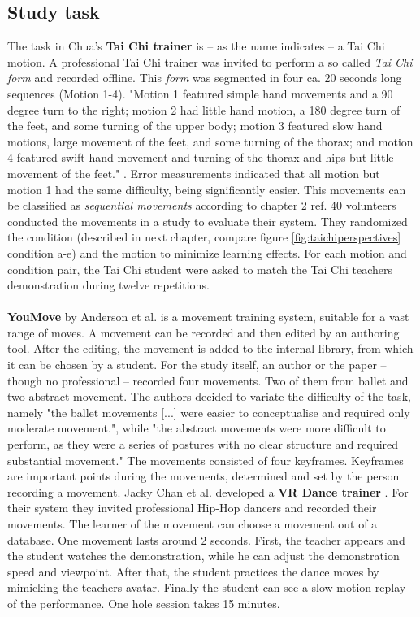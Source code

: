 \subsection{Study task}
The task in Chua's \cite{Chua} \textbf{Tai Chi trainer} is \--- as the name indicates \--- a Tai Chi motion. A professional Tai Chi trainer was invited to perform a so called \textit{Tai Chi form} and recorded offline. This \textit{form} was segmented in four ca. 20 seconds long sequences (Motion 1-4). "Motion 1 featured simple hand movements and a 90 degree turn to the right; motion 2 had little hand motion, a 180 degree turn of the feet, and some turning of the upper body; motion 3 featured slow hand motions, large movement of the feet, and some turning of the thorax; and motion 4 featured swift hand movement and turning of the thorax and hips but little movement of the feet." \cite{Chua}. Error measurements indicated that all motion but motion 1 had the same difficulty, being significantly easier. This movements can be classified as \textit{sequential movements} according to chapter 2 \todo ref. 40 volunteers conducted the movements in a study to evaluate their system. They randomized the condition (described in next chapter, compare figure \ref{fig:taichiperspectives} condition a-e) and the motion to minimize learning effects. For each motion and condition pair, the Tai Chi student were asked to match the Tai Chi teachers demonstration during twelve repetitions.\\ \\
\textbf{YouMove} by Anderson et al. \cite{Anderson2013} is a movement training system, suitable for a vast range of moves. A movement can be recorded and then edited by an authoring tool. After the editing, the movement is added to the internal library, from which it can be chosen by a student. For the study itself, an author or the paper \--- though no professional \--- recorded four movements. Two of them from ballet and two abstract movement. The authors decided to variate the difficulty of the task, namely "the ballet movements [...] were easier to conceptualise and required only moderate movement.", while "the abstract movements were more difficult to perform, as they were a series of postures with no clear structure and required substantial movement." The movements consisted of four keyframes. Keyframes are important points during the movements, determined and set by the person recording a movement.
Jacky Chan et al. developed a \textbf{VR Dance trainer} \cite{Chan2011}. For their system they invited professional Hip-Hop dancers and recorded their movements. The learner of the movement can choose a movement out of a database. One movement lasts around 2 seconds. First, the teacher appears and the student watches the demonstration, while he can adjust the demonstration speed and viewpoint. After that, the student practices the dance moves by mimicking the teachers avatar. Finally the student can see a slow motion replay of the performance. One hole session takes 15 minutes.

